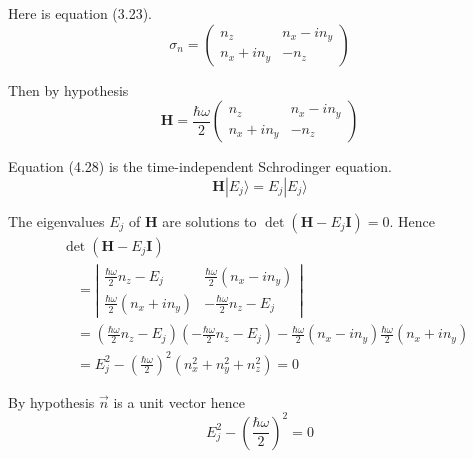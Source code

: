 


\bigskip
Here is equation (3.23).
\begin{equation*}
\sigma_n=\begin{pmatrix}
n_z & n_x-in_y
\\
n_x+in_y & -n_z
\end{pmatrix}
\tag{3.23}
\end{equation*}

Then by hypothesis
\begin{equation*}
\mathbf H=\frac{\hbar\omega}{2}
\begin{pmatrix}
n_z & n_x-in_y
\\
n_x+in_y & -n_z
\end{pmatrix}
\end{equation*}

Equation (4.28) is the time-independent Schrodinger equation.
\begin{equation*}
\mathbf H|E_j\rangle=E_j|E_j\rangle
\tag{4.28}
\end{equation*}

The eigenvalues $E_j$ of $\mathbf H$ are solutions to $\det(\mathbf H-E_j\mathbf I)=0$.
Hence
\begin{align*}
&\det(\mathbf H-E_j\mathbf I)
\\
&\quad{}=\left|
\begin{matrix}
\frac{\hbar\omega}{2}n_z-E_j & \frac{\hbar\omega}{2}(n_x-in_y)
\\[1ex]
\frac{\hbar\omega}{2}(n_x+in_y) & -\frac{\hbar\omega}{2}n_z-E_j
\end{matrix}
\right|
\\
&\quad{}=\left(\frac{\hbar\omega}{2}n_z-E_j\right)\left(-\frac{\hbar\omega}{2}n_z-E_j\right)
-\frac{\hbar\omega}{2}(n_x-in_y)\frac{\hbar\omega}{2}(n_x+in_y)
\\
&\quad{}=E_j^2-\left(\frac{\hbar\omega}{2}\right)^2\left(n_x^2+n_y^2+n_z^2\right)=0
\end{align*}

By hypothesis $\vec n$ is a unit vector hence
\begin{equation*}
E_j^2-\left(\frac{\hbar\omega}{2}\right)^2=0
\end{equation*}

